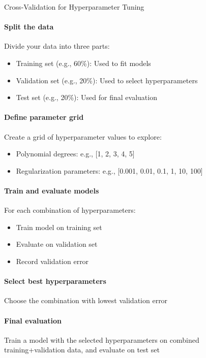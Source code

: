 \begin{KR}{Cross-Validation for Hyperparameter Tuning}
\paragraph{Split the data}
Divide your data into three parts:
\begin{itemize}
    \item Training set (e.g., 60\%): Used to fit models
    \item Validation set (e.g., 20\%): Used to select hyperparameters
    \item Test set (e.g., 20\%): Used for final evaluation
\end{itemize}

\paragraph{Define parameter grid}
Create a grid of hyperparameter values to explore:
\begin{itemize}
    \item Polynomial degrees: e.g., [1, 2, 3, 4, 5]
    \item Regularization parameters: e.g., [0.001, 0.01, 0.1, 1, 10, 100]
\end{itemize}

\paragraph{Train and evaluate models}
For each combination of hyperparameters:
\begin{itemize}
    \item Train model on training set
    \item Evaluate on validation set
    \item Record validation error
\end{itemize}

\paragraph{Select best hyperparameters}
Choose the combination with lowest validation error

\paragraph{Final evaluation}
Train a model with the selected hyperparameters on combined training+validation data, and evaluate on test set
\end{KR}

